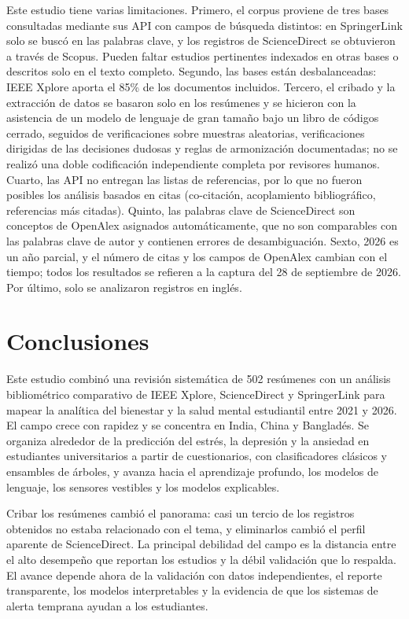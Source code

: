 \documentclass[11pt,a4paper]{article}
\begin{document}
Este estudio tiene varias limitaciones. Primero, el corpus proviene de tres bases consultadas mediante sus API con campos de búsqueda distintos: en SpringerLink solo se buscó en las palabras clave, y los registros de ScienceDirect se obtuvieron a través de Scopus. Pueden faltar estudios pertinentes indexados en otras bases o descritos solo en el texto completo. Segundo, las bases están desbalanceadas: IEEE Xplore aporta el 85\% de los documentos incluidos. Tercero, el cribado y la extracción de datos se basaron solo en los resúmenes y se hicieron con la asistencia de un modelo de lenguaje de gran tamaño bajo un libro de códigos cerrado, seguidos de verificaciones sobre muestras aleatorias, verificaciones dirigidas de las decisiones dudosas y reglas de armonización documentadas; no se realizó una doble codificación independiente completa por revisores humanos. Cuarto, las API no entregan las listas de referencias, por lo que no fueron posibles los análisis basados en citas (co-citación, acoplamiento bibliográfico, referencias más citadas). Quinto, las palabras clave de ScienceDirect son conceptos de OpenAlex asignados automáticamente, que no son comparables con las palabras clave de autor y contienen errores de desambiguación. Sexto, 2026 es un año parcial, y el número de citas y los campos de OpenAlex cambian con el tiempo; todos los resultados se refieren a la captura del 28 de septiembre de 2026. Por último, solo se analizaron registros en inglés.

\section{Conclusiones}\label{sec:conclusions}

Este estudio combinó una revisión sistemática de 502 resúmenes con un análisis bibliométrico comparativo de IEEE Xplore, ScienceDirect y SpringerLink para mapear la analítica del bienestar y la salud mental estudiantil entre 2021 y 2026. El campo crece con rapidez y se concentra en India, China y Bangladés. Se organiza alrededor de la predicción del estrés, la depresión y la ansiedad en estudiantes universitarios a partir de cuestionarios, con clasificadores clásicos y ensambles de árboles, y avanza hacia el aprendizaje profundo, los modelos de lenguaje, los sensores vestibles y los modelos explicables.

Cribar los resúmenes cambió el panorama: casi un tercio de los registros obtenidos no estaba relacionado con el tema, y eliminarlos cambió el perfil aparente de ScienceDirect. La principal debilidad del campo es la distancia entre el alto desempeño que reportan los estudios y la débil validación que lo respalda. El avance depende ahora de la validación con datos independientes, el reporte transparente, los modelos interpretables y la evidencia de que los sistemas de alerta temprana ayudan a los estudiantes.
\end{document}
